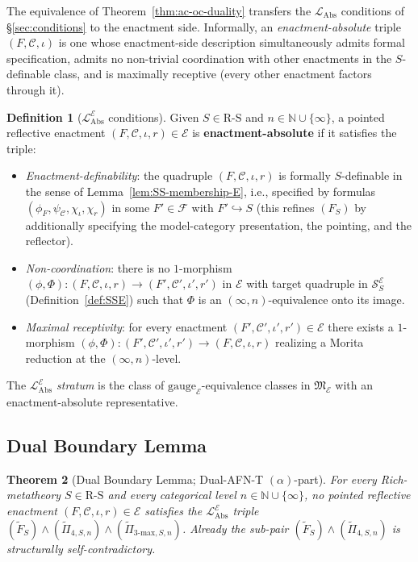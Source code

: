 \documentclass[11pt]{article}
\theoremstyle{plain}
\newtheorem{theorem}{Theorem}[section]
\theoremstyle{definition}
\newtheorem{definition}[theorem]{Definition}
\newcommand{\RS}{\mathrm{R\text{-}S}}
\newcommand{\cS}{\mathcal{S}}
\newcommand{\cF}{\mathcal{F}}
\newcommand{\cC}{\mathcal{C}}
\newcommand{\fM}{\mathfrak{M}}
\newcommand{\LAbs}{\mathcal{L}_{\mathrm{Abs}}}
\newcommand{\cE}{\mathcal{E}}
\newcommand{\LAbsE}{\LAbs^{\cE}}
\newcommand{\SSE}{\cS_{S}^{\cE}}
\begin{document}
The equivalence of Theorem~\ref{thm:ac-oc-duality} transfers the $\LAbs$ conditions of \S\ref{sec:conditions} to the enactment side. Informally, an \emph{enactment-absolute} triple $(F, \cC, \iota)$ is one whose enactment-side description simultaneously admits formal specification, admits no non-trivial coordination with other enactments in the $S$-definable class, and is maximally receptive (every other enactment factors through it).

\begin{definition}[$\LAbsE$ conditions]\label{def:level6-cE}
Given $S \in \RS$ and $n \in \mathbb{N} \cup \{\infty\}$, a pointed reflective enactment $(F, \cC, \iota, r) \in \cE$ is \textbf{enactment-absolute} if it satisfies the triple:
\begin{itemize}
\item[$(\tilde{F}_S)$] \emph{Enactment-definability}: the quadruple $(F, \cC, \iota, r)$ is formally $S$-definable in the sense of Lemma~\ref{lem:SS-membership-E}, i.e., specified by formulas $(\phi_F, \psi_\cC, \chi_\iota, \chi_r)$ in some $F' \in \cF$ with $F' \hookrightarrow S$ (this refines $(F_S)$ by additionally specifying the model-category presentation, the pointing, and the reflector).
\item[$(\tilde{\Pi}_{4, S, n})$] \emph{Non-coordination}: there is no $1$-morphism $(\phi, \Phi) : (F, \cC, \iota, r) \to (F', \cC', \iota', r')$ in $\cE$ with target quadruple in $\SSE$ (Definition~\ref{def:SSE}) such that $\Phi$ is an $(\infty, n)$-equivalence onto its image.
\item[$(\tilde{\Pi}_{3\text{-max}, S, n})$] \emph{Maximal receptivity}: for every enactment $(F', \cC', \iota', r') \in \cE$ there exists a $1$-morphism $(\phi, \Phi) : (F', \cC', \iota', r') \to (F, \cC, \iota, r)$ realizing a Morita reduction at the $(\infty, n)$-level.
\end{itemize}
The \emph{$\LAbsE$ stratum} is the class of $\mathrm{gauge}_\cE$-equivalence classes in $\fM_\cE$ with an enactment-absolute representative.
\end{definition}

\subsection{Dual Boundary Lemma}

\begin{theorem}[Dual Boundary Lemma; Dual-AFN-T $(\alpha)$-part]\label{thm:dual-afnt}
For every Rich-metatheory $S \in \RS$ and every categorical level $n \in \mathbb{N} \cup \{\infty\}$, no pointed reflective enactment $(F, \cC, \iota, r) \in \cE$ satisfies the $\LAbsE$ triple $(\tilde{F}_S) \wedge (\tilde{\Pi}_{4, S, n}) \wedge (\tilde{\Pi}_{3\text{-max}, S, n})$. Already the sub-pair $(\tilde{F}_S) \wedge (\tilde{\Pi}_{4, S, n})$ is structurally self-contradictory.
\end{theorem}
\end{document}

